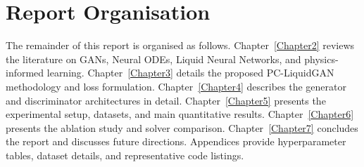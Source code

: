 \section{Report Organisation}

The remainder of this report is organised as follows. Chapter~\ref{Chapter2} reviews the literature on GANs, Neural ODEs, Liquid Neural Networks, and physics-informed learning. Chapter~\ref{Chapter3} details the proposed PC-LiquidGAN methodology and loss formulation. Chapter~\ref{Chapter4} describes the generator and discriminator architectures in detail. Chapter~\ref{Chapter5} presents the experimental setup, datasets, and main quantitative results. Chapter~\ref{Chapter6} presents the ablation study and solver comparison. Chapter~\ref{Chapter7} concludes the report and discusses future directions. Appendices provide hyperparameter tables, dataset details, and representative code listings.
